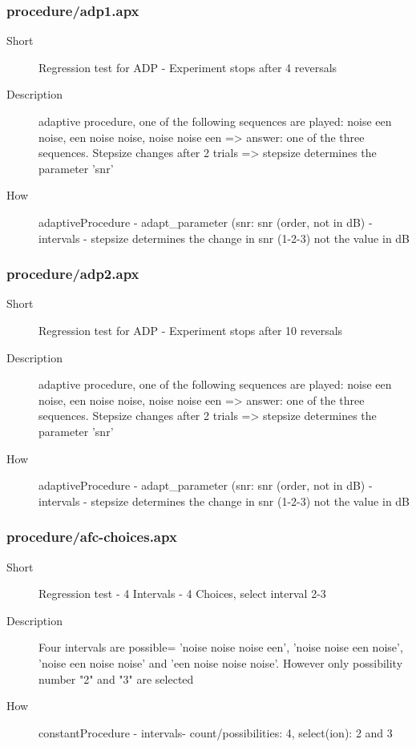 \subsubsection{procedure/adp1.apx}
\begin{description}
\item[Short] 
 Regression test for ADP - Experiment stops after 4 reversals
\item[Description] 
 adaptive procedure, one of the following sequences are played: noise een noise, een noise noise, noise noise een =\textgreater{} answer: one of the three sequences. Stepsize changes after 2 trials =\textgreater{} stepsize determines the parameter 'snr'
\item[How] 
 adaptiveProcedure - adapt\_parameter (snr: snr (order, not in dB) - intervals - stepsize determines the change in snr (1-2-3) not the value in dB
\end{description}

\subsubsection{procedure/adp2.apx}
\begin{description}
\item[Short] 
 Regression test for ADP - Experiment stops after 10 reversals
\item[Description] 
 adaptive procedure, one of the following sequences are played: noise een noise, een noise noise, noise noise een =\textgreater{} answer: one of the three sequences. Stepsize changes after 2 trials =\textgreater{} stepsize determines the parameter 'snr'
\item[How] 
 adaptiveProcedure - adapt\_parameter (snr: snr (order, not in dB) - intervals - stepsize determines the change in snr (1-2-3) not the value in dB
\end{description}

\subsubsection{procedure/afc-choices.apx}
\begin{description}
\item[Short] 
 Regression test - 4 Intervals - 4 Choices, select interval 2-3
\item[Description] 
 Four intervals are possible= 'noise noise noise een', 'noise noise een noise', 'noise een noise noise' and 'een noise noise noise'. However only possibility number "2" and "3" are selected
\item[How] 
 constantProcedure - intervals- count/possibilities: 4, select(ion): 2 and 3
\end{description}

